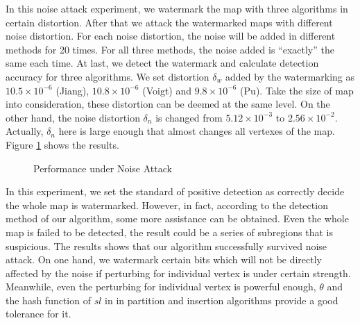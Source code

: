 In this noise attack experiment, we watermark the map with three algorithms in certain 
distortion. After that we attack the watermarked maps with different noise distortion. 
For each noise distortion, the noise will be added in different methods for 20 times. 
For all three methods, the noise added is ``exactly'' the same each time.
At last, we detect the watermark and calculate detection accuracy for three algorithms. 
We set distortion $\delta_w$ added by the watermarking as $10.5\times 10^{ -6 }$ (Jiang), 
$10.8\times 10^{-6}$ (Voigt) and $9.8\times 10^{-6}$ (Pu). Take the size of map into consideration,
these distortion can be deemed at the same level. On the other hand, the noise distortion 
$\delta_n$ is changed from $5.12 \times 10^{-3}$ to 
$2.56 \times 10^{-2}$. Actually, $\delta_n$ here is large enough that almost changes all 
vertexes of the map. Figure \ref{fig:noise} shows the results.
 


\begin{figure}[th]
\centering
{}
\caption{Performance under Noise Attack %
}
\label{fig:noise}
\end{figure}

In this experiment, we set the standard of positive detection as correctly
decide the whole map is watermarked. However, in fact, according to the 
detection method of our algorithm, some more assistance can be obtained.
Even the whole map is failed to be detected, the result could be a series
of subregions that is suspicious. 
The results shows that our algorithm successfully survived noise 
attack. On one hand, we watermark certain bits which will not be directly affected by 
the noise if perturbing for individual vertex is under certain strength. 
Meanwhile, even the perturbing for individual vertex is powerful enough, 
$\theta $ and the hash function of $sl$ in in partition and insertion 
algorithms provide a good tolerance for it. 
   
